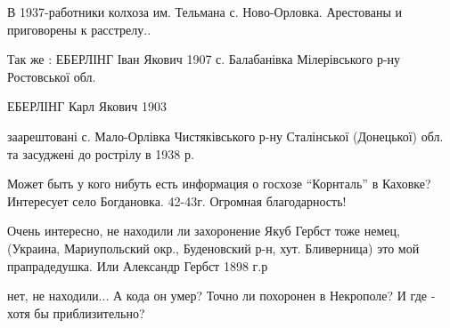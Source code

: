 
В 1937-работники колхоза им. Тельмана с. Ново-Орловка. Арестованы и приговорены к расстрелу..


Так же : ЕБЕРЛІНГ Іван Якович 1907 с. Балабанівка Мілерівського р-ну Ростовської обл.

ЕБЕРЛІНГ Карл Якович 1903


заарештовані с. Мало-Орлівка Чистяківського р-ну Сталінської (Донецької) обл. та засуджені до рострілу в 1938 р.


Может быть у кого нибуть есть информация о госхозе \enquote{Корнталь} в Каховке?
Интересует село Богдановка. 42-43г. Огромная благодарность!


Очень интересно, не находили ли захоронение Якуб Гербст тоже немец, (Украина,
Мариупольский окр., Буденовский р-н, хут. Бливерница) это мой прапрадедушка. Или
Александр Гербст 1898 г.р


нет, не находили... А кода он умер? Точно ли похоронен в Некрополе? И где - хотя бы приблизительно?
